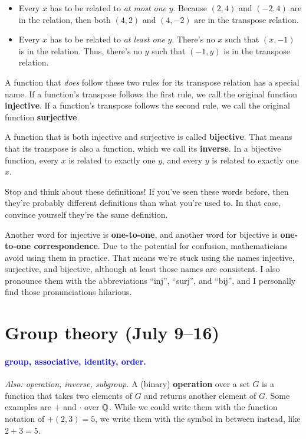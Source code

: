 \documentclass[11pt,paper=letter]{scrartcl}
\renewcommand{\bluebf}[1]{{\bfseries \color{Blue} #1}}
\renewcommand\wp[1]{\paragraph{\textcolor{Blue}{#1.}} \hspace{-1em}}
\newcommand\wl[1]{\label{w:#1}}
\newcommand\oww[1]{\textit{Also: #1.}}
\begin{document}
\begin{itemize}
  \item Every $x$ has to be related to \textit{at most one} $y$. Because $(2, 4)$ and $(-2, 4)$ are in the relation, then both $(4, 2)$ and $(4, -2)$ are in the transpose relation.
  \item Every $x$ has to be related to \textit{at least one} $y$. There's no $x$ such that $(x, -1)$ is in the relation. Thus, there's no $y$ such that $(-1, y)$ is in the transpose relation.
\end{itemize}

A function that \textit{does} follow these two rules for its transpose relation has a special name. If a function's transpose follows the first rule, we call the original function \textbf{injective}. If a function's transpose follows the second rule, we call the original function \textbf{surjective}.

A function that is both injective and surjective is called \textbf{bijective}. That means that its transpose is also a function, which we call its \textbf{inverse}. In a bijective function, every $x$ is related to exactly one $y$, and every $y$ is related to exactly one $x$.

\begin{exrboxed}
  Stop and think about these definitions! If you've seen these words before, then they're probably different definitions than what you're used to. In that case, convince yourself they're the same definition.
\end{exrboxed}

Another word for injective is \bluebf{one-to-one}, and another word for bijective is \bluebf{one-to-one correspondence}. Due to the potential for confusion, mathematicians avoid using them in practice. That means we're stuck using the names injective, surjective, and bijective, although at least those names are consistent. I also pronounce them with the abbreviations ``inj'', ``surj'', and ``bij'', and I personally find those pronunciations hilarious.

\section{Group theory (July 9--16)}

\wp{group, associative, identity, order}
\wl{group}
\wl{associative}
\wl{identity}
\wl{order}
\oww{operation, inverse, subgroup}
A (binary) \textbf{operation} over a set $G$ is a function that takes two elements of $G$ and returns another element of $G$. Some examples are $+$ and $\cdot$ over $\mathbb Q$. While we could write them with the function notation of $+(2, 3) = 5$, we write them with the symbol in between instead, like $2 + 3 = 5$.
\end{document}
